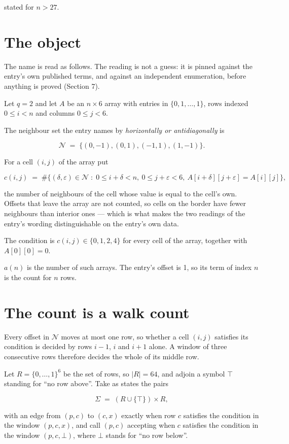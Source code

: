 \documentclass[11pt]{article}
\theoremstyle{definition}
\begin{document}
stated for $n > 27$.

\section{The object}

The name is read as follows. The reading is not a guess: it is pinned against the entry's own published terms, and against an independent enumeration, before anything is proved (Section 7).

Let $q = 2$ and let $A$ be an $n \times 6$ array with entries in $\{0,1,\dots,1\}$, rows indexed $0 \le i < n$ and columns $0 \le j < 6$.

The neighbour set the entry names by {\itshape horizontally or antidiagonally} is

\[\mathcal{N} \;=\; \{(0,-1), (0,1), (-1,1), (1,-1)\}.\]

For a cell $(i,j)$ of the array put

\[c(i,j) \;=\; \#\bigl\{(\delta,\varepsilon)\in\mathcal{N} \;:\; 0\le i+\delta<n,\ 0\le j+\varepsilon<6,\ A[i+\delta][j+\varepsilon] = A[i][j]\bigr\},\]

the number of neighbours of the cell whose value is equal to the cell's own. Offsets that leave the array are not counted, so cells on the border have fewer neighbours than interior ones --- which is what makes the two readings of the entry's wording distinguishable on the entry's own data.

The condition is $c(i,j) \in \{0, 1, 2, 4\}$ for every cell of the array, together with $A[0][0]=0$.

$a(n)$ is the number of such arrays. The entry's offset is 1, so its term of index $n$ is the count for $n$ rows.

\section{The count is a walk count}

Every offset in $\mathcal{N}$ moves at most one row, so whether a cell $(i,j)$ satisfies its condition is decided by rows $i-1$, $i$ and $i+1$ alone. A window of three consecutive rows therefore decides the whole of its middle row.

Let $R = \{0,\dots,1\}^{6}$ be the set of rows, so $|R| = 64$, and adjoin a symbol $\top$ standing for ``no row above''. Take as states the pairs

\[\Sigma \;=\; (R \cup \{\top\}) \times R,\]

with an edge from $(p,c)$ to $(c,x)$ exactly when row $c$ satisfies the condition in the window $(p,c,x)$, and call $(p,c)$ accepting when $c$ satisfies the condition in the window $(p,c,\bot)$, where $\bot$ stands for ``no row below''.
\end{document}
